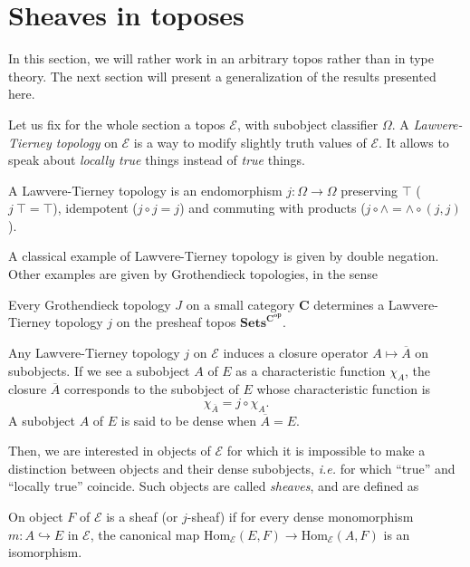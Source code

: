 \documentclass[notfinal]{jfrarticle}
\newcommand \True {\top}
\newcommand \closure[1] {\overline{#1}}
\newcommand \Char[1] {\chi_{#1}}%
\newcommand \Hom[1] {\mathrm{Hom}_{#1}}
\newcommand{\ie}{\emph{i.e.}}
\begin{document}
\section{Sheaves in toposes}
\label{sec:sheaf_topos}

In this section, we will rather work in an arbitrary topos rather than in type theory. The next section will present a
generalization of the results presented here.

Let us fix for the whole section a topos $\mathcal E$, with subobject
classifier $\Omega$. A {\em Lawvere-Tierney topology} on $\mathcal E$
is a way to modify slightly truth values of $\mathcal E$. It allows to
speak about {\em locally true} things instead of {\em true} things.

\begin{defi}\label{defi:LT}
  A Lawvere-Tierney topology is an endomorphism $j:\Omega \to \Omega$
  preserving $\True$ ($j \ \True = \True$), idempotent ($j\circ j =
  j$) and commuting with products ($j \circ \wedge = \wedge \circ (j,j)$).
\end{defi}

A classical example of Lawvere-Tierney topology is given by double
negation. Other examples are given by Grothendieck topologies, in the
sense
\begin{thm}
  Every Grothendieck topology $J$ on a small category $\mathbf C$ determines a
  Lawvere-Tierney topology $j$ on the presheaf topos
  $\mathbf{Sets}^{\mathbf C^{\mathbf{op}}}$.
\end{thm}

Any Lawvere-Tierney topology $j$ on $\mathcal E$ induces a closure operator
$A \mapsto \closure{A}$ on subobjects. If we see a subobject $A$ of $E$
as a characteristic function $\Char{A}$, the closure $\closure{A}$
corresponds to the subobject of $E$ whose characteristic function is 
%
\[
\Char{\closure{A}} = j \circ \Char{A}.
\]%
%
A subobject $A$ of $E$ is said to
be dense when $\closure{A} = E$.

Then, we are interested in objects of $\mathcal E$ for which it is
impossible to make a distinction between objects and their dense
subobjects, \ie{} for which ``true'' and ``locally true''
coincide. Such objects are called {\em sheaves}, and are defined as

\begin{defi}
  On object $F$ of $\mathcal E$ is a sheaf (or $j$-sheaf) if for every
  dense monomorphism $m: A \hookrightarrow E$ in $\mathcal E$, the
  canonical map $\Hom{\mathcal E}(E,F) \rightarrow \Hom{\mathcal E}(A,F)$ is an
isomorphism.
\end{defi}
\end{document}
